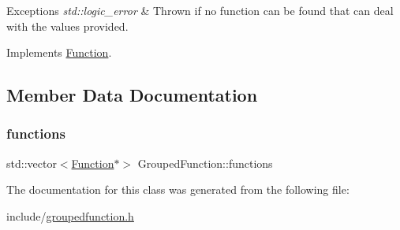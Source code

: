 \begin{DoxyExceptions}{Exceptions}
{\em std\+::logic\+\_\+error} & Thrown if no function can be found that can deal with the values provided. \\
\hline
\end{DoxyExceptions}


Implements \hyperlink{classFunction_a84f9a63e68becc27e58ea738ba4cd698}{Function}.



\subsection{Member Data Documentation}
\mbox{\label{classGroupedFunction_a34767023406ae622e9d33d81584e969a}} 
\subsubsection{\texorpdfstring{functions}{functions}}
{\footnotesize\ttfamily std\+::vector$<$\hyperlink{classFunction}{Function}$\ast$$>$ Grouped\+Function\+::functions}



The documentation for this class was generated from the following file\+:\begin{DoxyCompactItemize}
\item 
include/\hyperlink{groupedfunction_8h}{groupedfunction.\+h}\end{DoxyCompactItemize}
